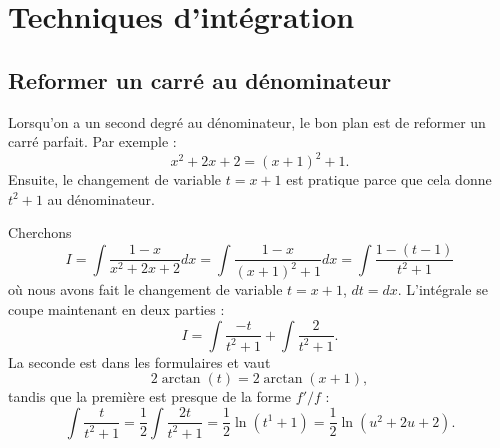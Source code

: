 
\section{Techniques d'intégration}

\subsection{Reformer un carré au dénominateur}
\label{subsecCarreDenoPar}

Lorsqu'on a un second degré au dénominateur, le bon plan est de reformer un carré parfait. Par exemple : 
\begin{equation}
	x^2+2x+2=(x+1)^2+1.
\end{equation}
Ensuite, le changement de variable $t=x+1$ est pratique parce que cela donne $t^2+1$ au dénominateur.

Cherchons
\begin{equation}
	I=\int \frac{ 1-x }{ x^2+2x+2 }dx=\int\frac{ 1-x }{ (x+1)^2+1 }dx=\int\frac{ 1-(t-1) }{ t^2+1 }
\end{equation}
où nous avons fait le changement de variable $t=x+1$, $dt=dx$. L'intégrale se coupe maintenant en deux parties :
\begin{equation}
	I=\int\frac{ -t }{ t^2+1 }+\int \frac{ 2 }{ t^2+1 }.
\end{equation}
La seconde est dans les formulaires et vaut 
\begin{equation}
	2\arctan(t)=2\arctan(x+1),
\end{equation}
tandis que la première est presque de la forme $f'/f$ :
\begin{equation}
	\int\frac{ t }{ t^2+1 }=\frac{ 1 }{2}\int \frac{ 2t }{ t^2+1 }=\frac{ 1 }{2}\ln(t^1+1)=\frac{ 1 }{2}\ln(u^2+2u+2).
\end{equation}

